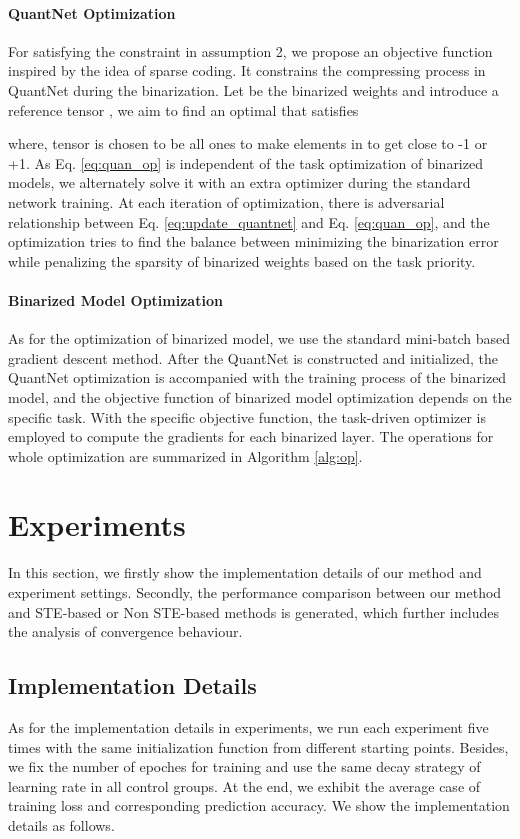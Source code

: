 \documentclass[runningheads]{llncs}
\begin{document}
\paragraph{\textbf{QuantNet Optimization}}
For satisfying the constraint in assumption 2, we propose an objective function inspired by the idea of sparse coding.
It constrains the compressing process in QuantNet during the binarization.
Let  be the binarized weights and introduce a reference tensor ,
we aim to find an optimal  that satisfies


where, tensor  is chosen to be all ones to make elements in  to get close to -1 or +1.
As Eq. \ref{eq:quan_op} is independent of the task optimization of binarized models,
we alternately solve it with an extra optimizer during the standard network training.
At each iteration of optimization, there is adversarial relationship
between Eq. \ref{eq:update_quantnet} and Eq. \ref{eq:quan_op},
and the optimization tries to find the balance between minimizing the binarization error
while penalizing the sparsity of binarized weights based on the task priority.

\paragraph{\textbf{Binarized Model Optimization}}
As for the optimization of binarized model,
we use the standard mini-batch based gradient descent method.
After the QuantNet  is constructed and initialized,
the QuantNet optimization is accompanied with the training process of the binarized model,
and the objective function of binarized model optimization depends on the specific task.
With the specific objective function,
the task-driven optimizer is employed to compute the gradients for each binarized layer.
The operations for whole optimization are summarized in Algorithm \ref{alg:op}.

\section{Experiments}
In this section, we firstly show the implementation details of our method and experiment settings.
Secondly, the performance comparison between our method and STE-based or Non STE-based methods is generated,
which further includes the analysis of convergence behaviour.

\subsection{Implementation Details}
As for the implementation details in experiments,
we run each experiment five times with the same initialization function from different starting points.
Besides, we fix the number of epoches for training and
use the same decay strategy of learning rate in all control groups.
At the end, we exhibit the average case of training loss and corresponding prediction accuracy.
We show the implementation details as follows.
\end{document}

